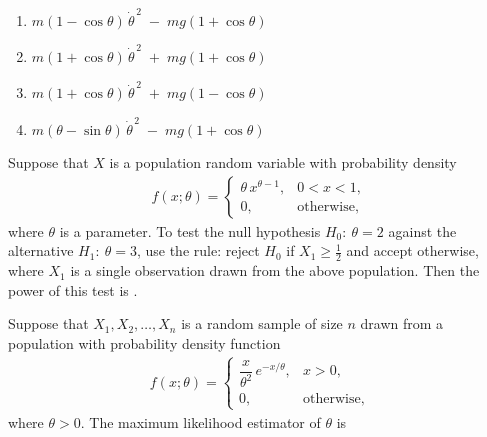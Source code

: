 \documentclass[journal,12pt,onecolumn]{IEEEtran}
\theoremstyle{remark}
\begin{document}
\begin{enumerate}
{\hfill{}

\begin{enumerate}[label=\Alph*.,itemsep=.35\baselineskip]
\item \(m(1-\cos\theta)\,\dot\theta^{\,2}\;-\;mg(1+\cos\theta)\)
\item \(m(1+\cos\theta)\,\dot\theta^{\,2}\;+\;mg(1+\cos\theta)\)
\item \(m(1+\cos\theta)\,\dot\theta^{\,2}\;+\;mg(1-\cos\theta)\)
\item \(m(\theta-\sin\theta)\,\dot\theta^{\,2}\;-\;mg(1+\cos\theta)\)
\end{enumerate}

\item Suppose that $X$ is a population random variable with probability density
\begin{align*}
f(x;\theta)=
\begin{cases}
\theta\,x^{\theta-1}, & 0<x<1,\\[2pt]
0, & \text{otherwise},
\end{cases}
\end{align*}
where $\theta$ is a parameter. To test the null hypothesis $H_{0}:\ \theta=2$
against the alternative $H_{1}:\ \theta=3$, use the rule:
reject $H_{0}$ if $X_{1}\ge \tfrac12$ and accept otherwise, where
$X_{1}$ is a single observation drawn from the above population.
Then the power of this test is \underline{\hspace{3cm}}.

\hfill{}

\item Suppose that $X_{1},X_{2},\ldots,X_{n}$ is a random sample of size $n$ drawn
from a population with probability density function
\begin{align*}
f(x;\theta)=
\begin{cases}
\dfrac{x}{\theta^{2}}\,e^{-x/\theta}, & x>0,\\[4pt]
0, & \text{otherwise},
\end{cases}
\end{align*}
where $\theta>0$. The maximum likelihood estimator of $\theta$ is

\hfill{}

}
\end{enumerate}
\end{document}

